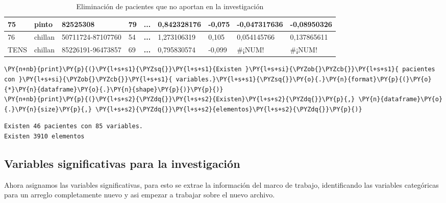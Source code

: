 \begin{table}[H]
{\begin{tabular}{|l|l|l|l|c|l|l|l|l|}
75 & pinto & 82525308 & 79 & \textbf{...} & 0,842328176 & -0,075 & -0,047317636 & -0,08950326 \\ \hline
76 & chillan & 50711724-87107760 & 54 & \textbf{...} & 1,273106319 & 0,105 & 0,054145766 & 0,137865611 \\ \hline
TENS & chillan & 85226191-96473857 & 69 & \textbf{...} & 0,795830574 & -0,099 & \#¡NUM! & \#¡NUM! \\ \hline
\end{tabular}%
}
\caption{Eliminación de pacientes que no aportan en la investigación}
\label{tab:bdd}
\end{table}
        
    \begin{tcolorbox}[breakable, size=fbox, boxrule=1pt, pad at break*=1mm,colback=cellbackground, colframe=cellborder]
\begin{Verbatim}[commandchars=\\\{\}]
\PY{n+nb}{print}\PY{p}{(}\PY{l+s+s1}{\PYZsq{}}\PY{l+s+s1}{Existen }\PY{l+s+si}{\PYZob{}\PYZcb{}}\PY{l+s+s1}{ pacientes con }\PY{l+s+si}{\PYZob{}\PYZcb{}}\PY{l+s+s1}{ variables.}\PY{l+s+s1}{\PYZsq{}}\PY{o}{.}\PY{n}{format}\PY{p}{(}\PY{o}{*}\PY{n}{dataframe}\PY{o}{.}\PY{n}{shape}\PY{p}{)}\PY{p}{)}
\PY{n+nb}{print}\PY{p}{(}\PY{l+s+s2}{\PYZdq{}}\PY{l+s+s2}{Existen}\PY{l+s+s2}{\PYZdq{}}\PY{p}{,} \PY{n}{dataframe}\PY{o}{.}\PY{n}{size}\PY{p}{,} \PY{l+s+s2}{\PYZdq{}}\PY{l+s+s2}{elementos}\PY{l+s+s2}{\PYZdq{}}\PY{p}{)}
\end{Verbatim}
\end{tcolorbox}

    \begin{Verbatim}[commandchars=\\\{\}]
Existen 46 pacientes con 85 variables.
Existen 3910 elementos
    \end{Verbatim}

    \hypertarget{variables-significativas-para-la-investigaciuxf3n}{%
\subsection{Variables significativas para la
investigación}\label{variables-significativas-para-la-investigaciuxf3n}}

Ahora asignamos las variables significativas, para esto se extrae la
información del marco de trabajo, identificando las variables
categóricas para un arreglo completamente nuevo y asi empezar a trabajar
sobre el nuevo archivo.

